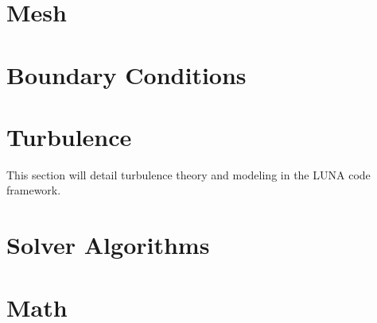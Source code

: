 \documentclass[conf]{new-aiaa}
\newcommand{\TexDir}{./attachments/tex/}
\begin{document}
\clearpage
\FloatBarrier
\section{Mesh}





\clearpage
\FloatBarrier
\section{Boundary Conditions}






\clearpage
\FloatBarrier
\section{Turbulence}

This section will detail turbulence theory and modeling in the LUNA code framework. 






\clearpage
\FloatBarrier
\section{Solver Algorithms}








\clearpage
\FloatBarrier
\section{Math}
\end{document}
